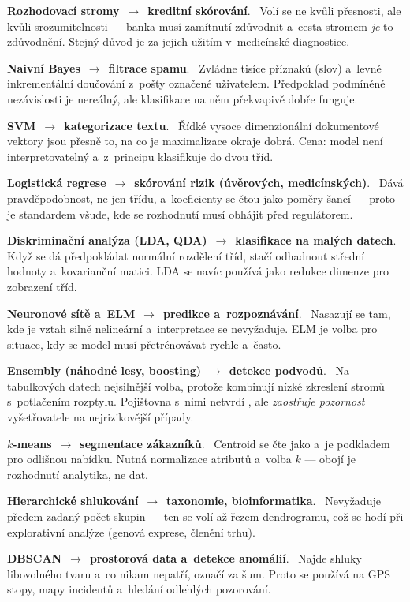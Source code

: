 \documentclass[11pt,a4paper]{article}
\newcommand{\apl}[2]{\par\addvspace{1.5mm}\noindent
  \textbf{#1}\ \textcolor{defframe}{$\rightarrow$}\ \textbf{#2}.\ \ignorespaces}
\begin{document}
\apl{Rozhodovací stromy}{kreditní skórování}
Volí se ne kvůli přesnosti, ale kvůli srozumitelnosti --- banka musí zamítnutí zdůvodnit
a~cesta stromem \emph{je} to zdůvodnění. Stejný důvod je za jejich užitím v~medicínské
diagnostice.

\apl{Naivní Bayes}{filtrace spamu}
Zvládne tisíce příznaků (slov) a~levné inkrementální doučování z~pošty označené uživatelem.
Předpoklad podmíněné nezávislosti je nereálný, ale klasifikace na něm překvapivě dobře
funguje.

\apl{SVM}{kategorizace textu}
Řídké vysoce dimenzionální dokumentové vektory jsou přesně to, na co je maximalizace okraje
dobrá. Cena: model není interpretovatelný a~z~principu klasifikuje do dvou tříd.

\apl{Logistická regrese}{skórování rizik (úvěrových, medicínských)}
Dává pravděpodobnost, ne jen třídu, a~koeficienty se čtou jako poměry šancí --- proto je
standardem všude, kde se rozhodnutí musí obhájit před regulátorem.

\apl{Diskriminační analýza (LDA, QDA)}{klasifikace na malých datech}
Když se dá předpokládat normální rozdělení tříd, stačí odhadnout střední hodnoty
a~kovarianční matici. LDA se navíc používá jako redukce dimenze pro zobrazení tříd.

\apl{Neuronové sítě a~ELM}{predikce a~rozpoznávání}
Nasazují se tam, kde je vztah silně nelineární a~interpretace se nevyžaduje. ELM je volba
pro situace, kdy se model musí přetrénovávat rychle a~často.

\apl{Ensembly (náhodné lesy, boosting)}{detekce podvodů}
Na tabulkových datech nejsilnější volba, protože kombinují nízké zkreslení stromů
s~potlačením rozptylu. Pojišťovna s~nimi netvrdí , ale \emph{zaostřuje pozornost}
vyšetřovatele na nejrizikovější případy.

\apl{$k$-means}{segmentace zákazníků}
Centroid se čte jako  a~je podkladem pro odlišnou nabídku.
Nutná normalizace atributů a~volba $k$ --- obojí je rozhodnutí analytika, ne dat.

\apl{Hierarchické shlukování}{taxonomie, bioinformatika}
Nevyžaduje předem zadaný počet skupin --- ten se volí až řezem dendrogramu, což se hodí
při explorativní analýze (genová exprese, členění trhu).

\apl{DBSCAN}{prostorová data a~detekce anomálií}
Najde shluky libovolného tvaru a~co nikam nepatří, označí za šum. Proto se používá na GPS
stopy, mapy incidentů a~hledání odlehlých pozorování.
\end{document}
